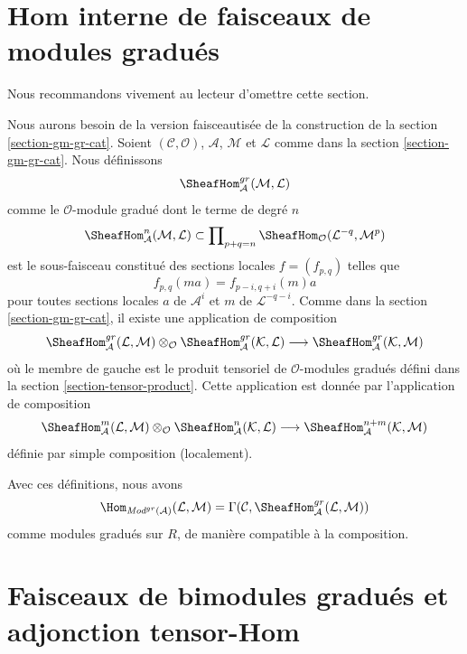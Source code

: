 \section{Hom interne de faisceaux de modules gradués}
\label{section-internal-hom-graded}

\noindent Nous
recommandons vivement au lecteur d'omettre cette section.

\medskip\noindent
Nous aurons besoin de la version faisceautisée de la construction de
la section \ref{section-gm-gr-cat}. Soient
$(\mathcal{C}, \mathcal{O})$, $\mathcal{A}$,
$\mathcal{M}$ et $\mathcal{L}$ comme dans la section \ref{section-gm-gr-cat}. Nous
définissons
$$
\SheafHom^{gr}_\mathcal{A}(\mathcal{M}, \mathcal{L})
$$ comme
le $\mathcal{O}$-module gradué dont le terme de degré $n$
$$
\SheafHom^n_\mathcal{A}(\mathcal{M}, \mathcal{L})
\subset
\prod\nolimits_{p + q = n}
\SheafHom_\mathcal{O}(\mathcal{L}^{-q}, \mathcal{M}^p)
$$ est le
sous-faisceau constitué des sections locales $f = (f_{p, q})$ telles que
$$
f_{p, q}(m a) = f_{p - i, q + i}(m)a
$$ pour toutes
sections locales $a$ de $\mathcal{A}^i$ et
$m$ de $\mathcal{L}^{-q - i}$. Comme dans la section \ref{section-gm-gr-cat}, il
existe une application de
composition $$
\SheafHom^{gr}_\mathcal{A}(\mathcal{L}, \mathcal{M}) \otimes_\mathcal{O}
\SheafHom^{gr}_\mathcal{A}(\mathcal{K}, \mathcal{L})
\longrightarrow
\SheafHom^{gr}_\mathcal{A}(\mathcal{K}, \mathcal{M})
$$ où
le membre de gauche est le produit tensoriel de $\mathcal{O}$-modules gradués défini
dans la section \ref{section-tensor-product}. Cette
application est donnée par l'application de
composition $$
\SheafHom^m_\mathcal{A}(\mathcal{L}, \mathcal{M}) \otimes_\mathcal{O}
\SheafHom^n_\mathcal{A}(\mathcal{K}, \mathcal{L}) \longrightarrow
\SheafHom^{n + m}_\mathcal{A}(\mathcal{K}, \mathcal{M})
$$
définie par simple composition (localement).

\medskip\noindent
Avec ces définitions, nous avons
$$
\Hom_{\textit{Mod}^{gr}(\mathcal{A})}(\mathcal{L}, \mathcal{M}) =
\Gamma(\mathcal{C}, \SheafHom^{gr}_\mathcal{A}(\mathcal{L}, \mathcal{M}))
$$ comme modules
gradués sur $R$, de manière compatible à la composition.







\section{Faisceaux de bimodules gradués et adjonction tensor-Hom}
\label{section-graded-bimodules}

